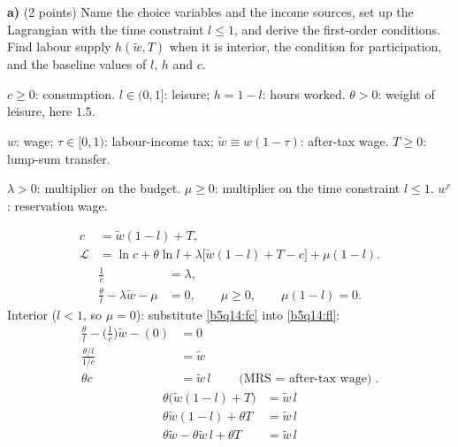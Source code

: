 \textbf{a)} (2 points) Name the choice variables and the income sources, set up the Lagrangian with the time constraint $l\le1$, and derive
the first-order conditions. Find labour supply $h(\tilde w,T)$ when it is interior, the condition for participation, and the baseline
values of $l$, $h$ and $c$.
\resolespaco
\begin{sol}
\begin{notacao}
\item $c\ge0$: consumption. $l\in(0,1]$: leisure; $h=1-l$: hours worked. $\theta>0$: weight of leisure, here $1.5$.
\item $w$: wage; $\tau\in[0,1)$: labour-income tax; $\tilde w\equiv w(1-\tau)$: after-tax wage. $T\ge0$: lump-sum transfer.
\item $\lambda>0$: multiplier on the budget. $\mu\ge0$: multiplier on the time constraint $l\le1$. $w^r$: reservation wage.
\end{notacao}
\begin{align}
c&=\tilde w(1-l)+T, \label{b5q14:bc}\\
\mathcal L&=\ln c+\theta\ln l+\lambda\big[\tilde w(1-l)+T-c\big]+\mu(1-l). \label{b5q14:L}
\end{align}
\begin{align}
\frac1c&=\lambda, \label{b5q14:fc}\\
\frac{\theta}{l}-\lambda\tilde w-\mu&=0,\qquad \mu\ge0,\qquad \mu(1-l)=0. \label{b5q14:fl}
\end{align}
Interior ($l<1$, so $\mu=0$): substitute \eqref{b5q14:fc} into \eqref{b5q14:fl}:
\begin{align}
\frac{\theta}{l}-\Big(\frac1c\Big)\tilde w-(0)&=0\nonumber\\
\frac{\theta/l}{1/c}&=\tilde w\nonumber\\
\theta c&=\tilde w\,l \qquad\text{(MRS $=$ after-tax wage)}. \label{b5q14:mrs}
\end{align}
\begin{align*}
\theta\big(\tilde w(1-l)+T\big)&=\tilde w\,l\\
\theta\tilde w(1-l)+\theta T&=\tilde w\,l\\
\theta\tilde w-\theta\tilde w\,l+\theta T&=\tilde w\,l\\

\end{align*}
\end{sol}
